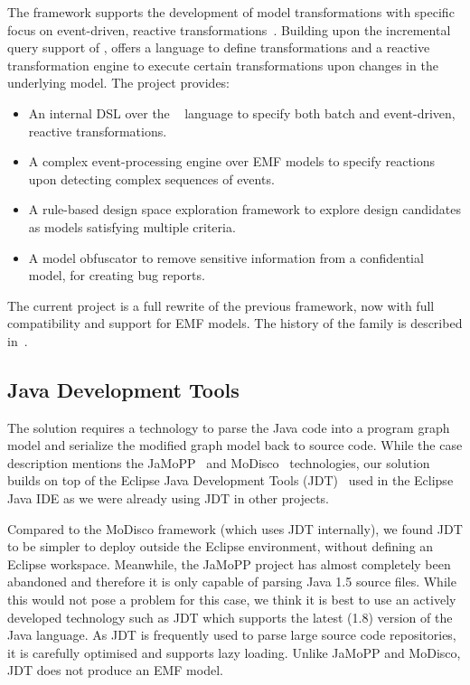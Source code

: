\documentclass[submission,copyright,creativecommons]{eptcs}
\begin{document}
The \viatra framework supports the development of model transformations with specific focus on event-driven, reactive transformations~\cite{viatra}. Building upon the incremental query support of \eiq, \viatra offers a language to define transformations and a reactive transformation engine to execute certain transformations upon changes in the underlying model. The \viatra project provides:

\begin{itemize}[noitemsep]
	\item An internal DSL over the \xtend~\cite{Xtend} language to specify both batch and event-driven, reactive transformations.
	\item A complex event-processing engine over EMF models to specify reactions upon detecting complex sequences of events.
	\item A rule-based design space exploration framework to explore design candidates as models satisfying multiple criteria.
	\item A model obfuscator to remove sensitive information from a confidential model, \eg for creating bug reports.
\end{itemize}

The current \viatra{} project is a full rewrite of the previous \viatratwo{} framework, now with full compatibility and support for EMF models. The history of the \viatra{} family is described in~\cite{viatra-history}.

\subsection{Java Development Tools}

The solution requires a technology to parse the Java code into a program graph model and serialize the modified graph model back to source code. While the case description mentions the JaMoPP~\cite{JaMoPP} and MoDisco~\cite{MoDisco} technologies, our solution builds on top of the Eclipse Java Development Tools (JDT)~\cite{jdt} used in the Eclipse Java IDE as we were already using JDT in other projects.

Compared to the MoDisco framework (which uses JDT internally), we found JDT to be simpler to deploy outside the Eclipse environment, \ie without defining an Eclipse workspace. Meanwhile, the JaMoPP project has almost completely been abandoned and therefore it is only capable of parsing Java 1.5 source files. While this would not pose a problem for this case, we think it is best to use an actively developed technology such as JDT which supports the latest (1.8) version of the Java language. As JDT is frequently used to parse large source code repositories, it is carefully optimised and supports lazy loading. Unlike JaMoPP and MoDisco, JDT does not produce an EMF model.
\end{document}

